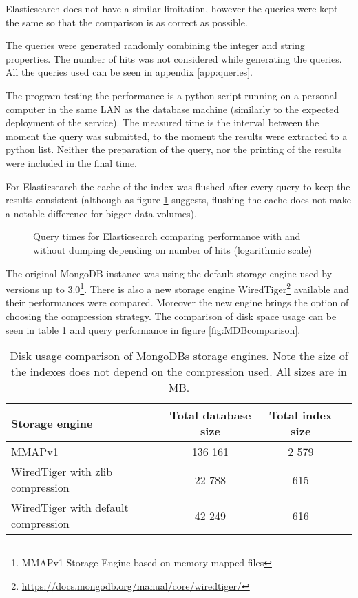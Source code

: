 Elasticsearch does not have a similar limitation, however the queries were kept
the same so that the comparison is as correct as possible.

The queries were generated randomly combining the integer and string properties. The number of hits was not 
considered while generating the queries. All the queries used can be seen in appendix \ref{app:queries}.

The program testing the performance is a python script running on a personal computer in the same LAN as the 
database machine (similarly to the expected deployment of the service). The measured time is the interval between 
the moment the query was submitted, to the moment the results were extracted to a python list. Neither the 
preparation of the query, nor the printing of the results were included in the final time. 

For Elasticsearch the cache of the index was flushed after every query to keep the results consistent (although as 
figure \ref{fig:EScache} suggests, flushing the cache does not make a notable difference for bigger data volumes). 

\begin{figure}[h]
	\centering
	
	\caption{Query times for Elasticsearch comparing performance with and without dumping depending on number of 
	hits (logarithmic scale)}
	\label{fig:EScache}
\end{figure}
\pagebreak
The original MongoDB instance was using the default storage engine used by versions up to 3.0\footnote{MMAPv1 
Storage Engine based on memory mapped files}. There is also a new storage engine WiredTiger\footnote{
\url{https://docs.mongodb.org/manual/core/wiredtiger/}} available and their performances were compared.
Moreover the new engine brings the option of choosing the compression strategy. The comparison of disk space usage 
can be seen in table \ref{tab:MongoComp} and query performance in figure \ref{fig:MDBcomparison}.

\begin{table}[t]
\centering
\begin{tabular}{lccc}
\toprule
\textbf{Storage engine}             & \textbf{Total database size} & \textbf{Total index size} \\ 
\midrule
MMAPv1                              & 136 161                      & 2 579 \\ 
WiredTiger with zlib compression    & 22 788                       & 615   \\ 
WiredTiger with default compression & 42 249                       & 616   \\ 
\toprule
\end{tabular}
\caption{Disk usage comparison of MongoDBs storage engines. Note the size of the indexes does not depend on the
compression used. All sizes are in MB.}
\label{tab:MongoComp}
\end{table}

